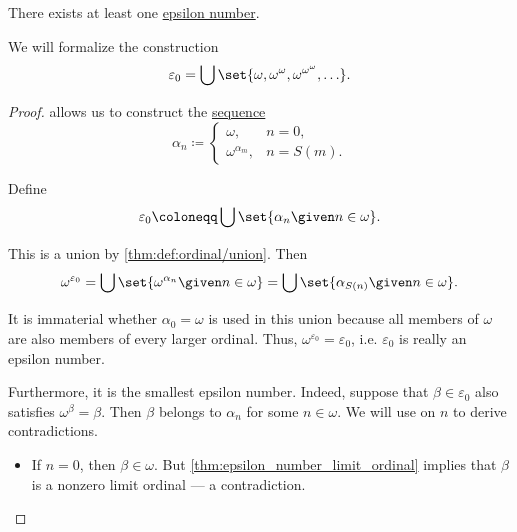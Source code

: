 \begin{proposition}\label{thm:epsilon_number_existence}
  There exists at least one \hyperref[def:epsilon_number]{epsilon number}.
\end{proposition}
\begin{comments}
  \item We will formalize the construction
  \begin{equation*}
    \varepsilon_0 = \bigcup\set{ \omega, \omega^\omega, \omega^{\omega^\omega}, \ldots }.
  \end{equation*}
\end{comments}
\begin{proof}
   allows us to construct the \hyperref[def:sequence]{sequence}
  \begin{equation*}
    \alpha_n \coloneqq \begin{cases}
      \omega,            &n = 0, \\
      \omega^{\alpha_m}, &n = S(m).
    \end{cases}
  \end{equation*}

  Define
  \begin{equation*}
    \varepsilon_0 \coloneqq \bigcup\set{ \alpha_n \given n \in \omega }.
  \end{equation*}

  This is a union by \cref{thm:def:ordinal/union}. Then
  \begin{equation*}
    \omega^{\varepsilon_0}
    =
    \bigcup\set{ \omega^{\alpha_n} \given n \in \omega }
    =
    \bigcup\set{ \alpha_{S(n)} \given n \in \omega }.
  \end{equation*}

  It is immaterial whether \( \alpha_0 = \omega \) is used in this union because all members of \( \omega \) are also members of every larger ordinal. Thus, \( \omega^{\varepsilon_0} = \varepsilon_0 \), i.e. \( \varepsilon_0 \) is really an epsilon number.

  Furthermore, it is the smallest epsilon number. Indeed, suppose that \( \beta \in \varepsilon_0 \) also satisfies \( \omega^\beta = \beta \). Then \( \beta \) belongs to \( \alpha_n \) for some \( n \in \omega \). We will use  on \( n \) to derive contradictions.
  \begin{itemize}
    \item If \( n = 0 \), then \( \beta \in \omega \). But \cref{thm:epsilon_number_limit_ordinal} implies that \( \beta \) is a nonzero limit ordinal --- a contradiction.


\end{itemize}
\end{proof}
